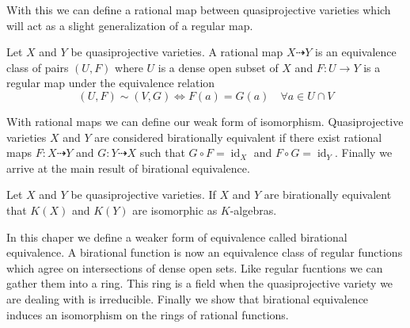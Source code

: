 \documentclass[40pt]{article}
\newcommand{\todash}{\dashrightarrow}
\DeclareMathOperator{\id}{\text{id}}
\theoremstyle{remark}
\begin{document}
		With this we can define a rational map between quasiprojective varieties which will act as a slight generalization of a regular map.
		\begin{newdef}
			Let $X$ and $Y$ be quasiprojective varieties. A rational map $X \todash Y$ is an equivalence class of pairs $(U,F)$ where $U$ is a dense open subset of $X$ and $F : U \to Y$ is a regular map under the equivalence relation
			\[
			(U,F) \sim (V,G) \iff F(a) = G(a) \quad \forall a \in U \cap V
			\]
		\end{newdef}
		With rational maps we can define our weak form of isomorphism. Quasiprojective varieties $X$ and $Y$ are considered birationally equivalent if there exist rational maps $F : X \todash Y$ and $G : Y \todash X$ such that $G \circ F = \id_X$ and $F \circ G = \id_Y$. Finally we arrive at the main result of birational equivalence. 
		\begin{prop}
			Let $X$ and $Y$ be quasiprojective varieties. If $X$ and $Y$ are birationally equivalent that $K(X)$ and $K(Y)$ are isomorphic as $K$-algebras.
		\end{prop}
		\begin{summary}
			In this chaper we define a weaker form of equivalence called birational equivalence. A birational function is now an equivalence class of regular functions which agree on intersections of dense open sets. Like regular fucntions we can gather them into a ring. This ring is a field when the quasiprojective variety we are dealing with is irreducible. Finally we show that birational equivalence induces an isomorphism on the rings of rational functions. 
		\end{summary}
\end{document}
